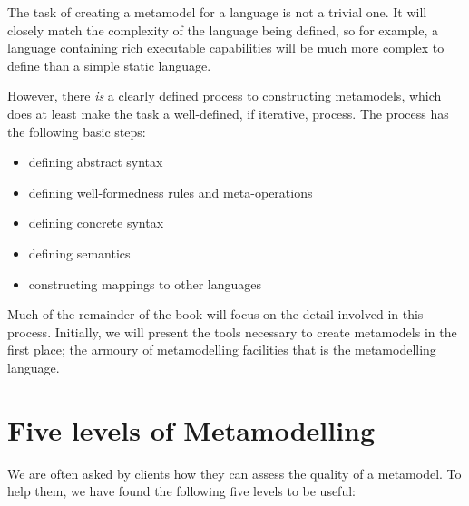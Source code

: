 The task of creating a metamodel for a language is not a trivial
one. It will closely match the complexity of the language being
defined, so for example, a language containing rich executable
capabilities will be much more complex to define than a simple
static language.

However, there {\em is} a clearly defined process to constructing
metamodels, which does at least make the task a well-defined, if
iterative, process. The process has the following basic steps:

\begin{itemize}
\item defining abstract syntax \item defining well-formedness
rules and meta-operations \item defining concrete syntax \item
defining semantics \item constructing mappings to other languages
\end{itemize}

Much of the remainder of the book will focus on the detail
involved in this process. Initially, we will present the tools
necessary to create metamodels in the first place; the armoury of
metamodelling facilities that is the metamodelling language.

\section{Five levels of Metamodelling}

We are often asked by clients how they can assess the quality of a
metamodel. To help them, we have found the following five levels
to be useful:

